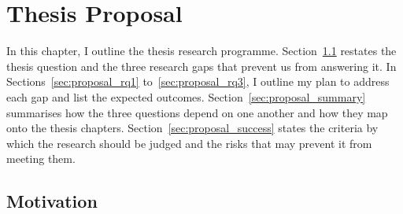 \chapter{Thesis Proposal}
\label{ch:proposal}

In this chapter, I outline the thesis research programme.
Section~\ref{sec:proposal_motivation} restates the thesis question and the three research gaps that prevent us from answering it.
In Sections~\ref{sec:proposal_rq1} to~\ref{sec:proposal_rq3}, I outline my plan to address each gap and list the expected outcomes.
Section~\ref{sec:proposal_summary} summarises how the three questions depend on one another and how they map onto the thesis chapters.
Section~\ref{sec:proposal_success} states the criteria by which the research should be judged and the risks that may prevent it from meeting them.

\section{Motivation}
\label{sec:proposal_motivation}


